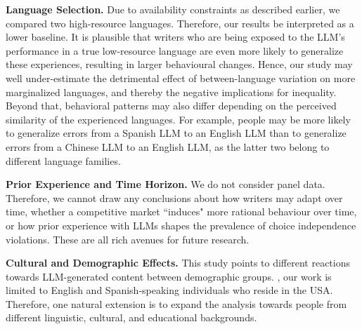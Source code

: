 \noindent
\textbf{Language Selection.} Due to availability constraints as described earlier, we compared two high-resource languages. Therefore, our results  be interpreted as a lower baseline. It is plausible that writers who are being exposed to the LLM's performance in a true low-resource language are even more likely to generalize these experiences, resulting in larger behavioural changes. Hence, our study may well under-estimate the detrimental effect of between-language variation on more marginalized languages, and thereby the negative implications for inequality.  Beyond that, behavioral patterns may also differ depending on the perceived similarity of the experienced languages. For example, people may be more likely to generalize errors from a Spanish LLM to an English LLM than to generalize errors from a Chinese LLM to an English LLM, as the latter two belong to different language families.

\noindent
\textbf{Prior Experience and Time Horizon.} We do not consider panel data. Therefore, we cannot draw any conclusions about how writers may adapt over time, whether a competitive market ``induces" more rational behaviour over time, or how prior experience with LLMs shapes the prevalence of choice independence violations.  These are all rich avenues for future research.

\noindent
\textbf{Cultural and Demographic Effects.} This study points to different reactions towards LLM-generated content between demographic groups.  , our work is limited to English and Spanish-speaking individuals who reside in the USA. Therefore, one natural extension is to expand the analysis towards people from different linguistic, cultural, and educational backgrounds. 

